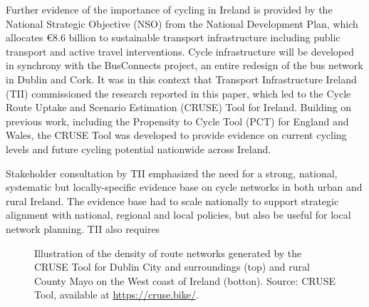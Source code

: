 \documentclass[
  super,
  preprint,
  3p]{elsarticle}
\begin{document}
Further evidence of the importance of cycling in Ireland is provided by
the National Strategic Objective (NSO) from the National Development
Plan, which allocates €8.6 billion to sustainable transport
infrastructure including public transport and active travel
interventions. Cycle infrastructure will be developed in synchrony with
the BusConnects project, an entire redesign of the bus network in Dublin
and Cork. It was in this context that Transport Infrastructure Ireland
(TII) commissioned the research reported in this paper, which led to the
Cycle Route Uptake and Scenario Estimation (CRUSE) Tool for Ireland.
Building on previous work, including the Propensity to Cycle Tool (PCT)
for England and Wales, the CRUSE Tool was developed to provide evidence
on current cycling levels and future cycling potential nationwide across
Ireland.

Stakeholder consultation by TII emphasized the need for a strong,
national, systematic but locally-specific evidence base on cycle
networks in both urban and rural Ireland. The evidence base had to scale
nationally to support strategic alignment with national, regional and
local policies, but also be useful for local network planning. TII also
requires

\begin{figure}


\caption{\label{fig-dublin}Illustration of the density of route networks
generated by the CRUSE Tool for Dublin City and surroundings (top) and
rural County Mayo on the West coast of Ireland (botton). Source: CRUSE
Tool, available at \url{https://cruse.bike/}.}

\end{figure}%
\end{document}
